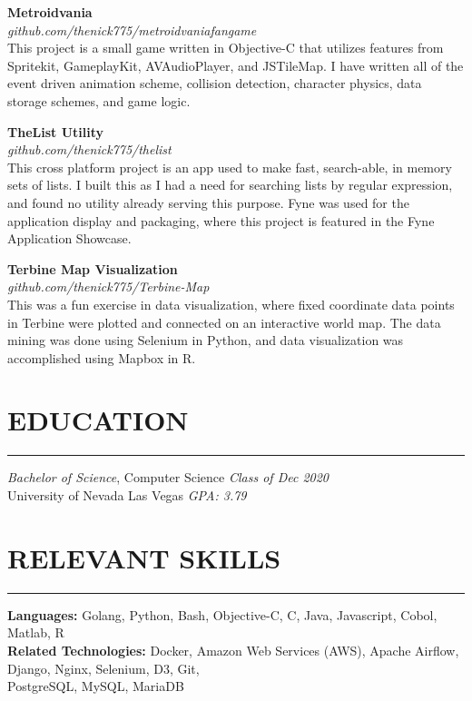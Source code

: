 \documentclass{res}
\begin{document}
\begin{resume}
		{\bf Metroidvania} \\
			\emph{github.com/thenick775/metroidvaniafangame} \hfill \vspace{3pt} \\
			This project is a small game written in Objective-C that utilizes features from Spritekit, GameplayKit, AVAudioPlayer, and JSTileMap. I have written all of the event driven animation scheme, collision detection, character physics, data storage schemes, and game logic.
\vspace{-4pt}

		{\bf TheList Utility} \\
			\emph{github.com/thenick775/thelist} \hfill \vspace{3pt} \\
			This cross platform project is an app used to make fast, search-able, in memory sets of lists. I built this as I had a need for searching lists by regular expression, and found no utility already serving this purpose. Fyne was used for the application display and packaging, where this project is featured in the Fyne Application Showcase.
			
\vspace{-4pt}

		{\bf Terbine Map Visualization} \\
			\emph{github.com/thenick775/Terbine-Map} \hfill \vspace{3pt} \\
			This was a fun exercise in data visualization, where fixed coordinate data points in Terbine were plotted and connected on an interactive world map. The data mining was done using Selenium in Python, and data visualization was accomplished using Mapbox in R.

\vspace{-4pt}

		\section{{EDUCATION}}
    \noindent\rule[0.5ex]{\linewidth}{1pt}
		{\sl Bachelor of Science}, Computer Science \hfill \emph{Class of Dec 2020} \\
		University of Nevada Las Vegas \hfill \emph{GPA: 3.79} \\ \vspace{-5mm}

		\section{{RELEVANT SKILLS}}
    \noindent\rule[0.5ex]{\linewidth}{1pt}
			{\bf Languages:} Golang, Python, Bash, Objective-C, C, Java, Javascript, Cobol, Matlab, R \\
			{\bf Related Technologies:} Docker, Amazon Web Services (AWS), Apache Airflow, Django, Nginx, Selenium, D3, Git,\ \\ PostgreSQL, MySQL, MariaDB

	\end{resume}
\end{document}
